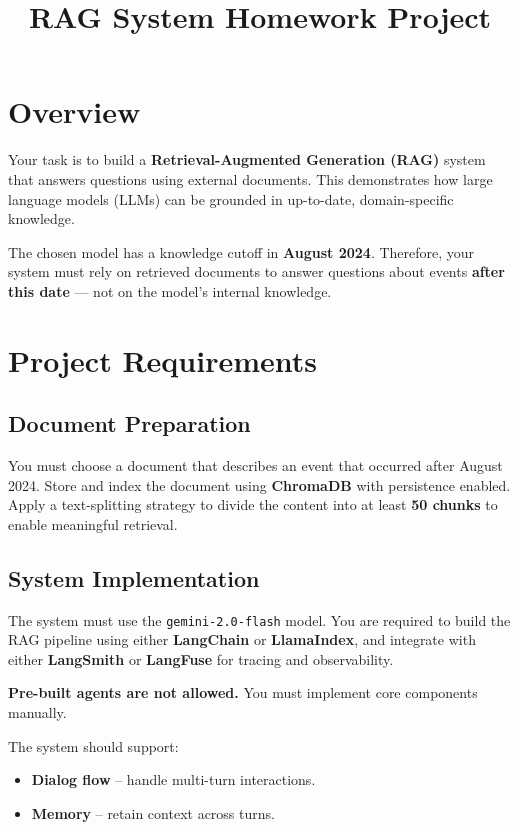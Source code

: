 \documentclass[12pt]{article}
\title{\textbf{RAG System Homework Project}}
\author{}
\date{}
\begin{document}
\maketitle

\section*{Overview}

Your task is to build a \textbf{Retrieval-Augmented Generation (RAG)} system that answers questions using external documents. This demonstrates how large language models (LLMs) can be grounded in up-to-date, domain-specific knowledge.

The chosen model has a knowledge cutoff in \textbf{August 2024}. Therefore, your system must rely on retrieved documents to answer questions about events \textbf{after this date} — not on the model’s internal knowledge.

\section*{Project Requirements}

\subsection*{Document Preparation}
You must choose a document that describes an event that occurred after August 2024. Store and index the document using \textbf{ChromaDB} with persistence enabled. Apply a text-splitting strategy to divide the content into at least \textbf{50 chunks} to enable meaningful retrieval.

\subsection*{System Implementation}
The system must use the \texttt{gemini-2.0-flash} model. You are required to build the RAG pipeline using either \textbf{LangChain} or \textbf{LlamaIndex}, and integrate with either \textbf{LangSmith} or \textbf{LangFuse} for tracing and observability.

\textbf{Pre-built agents are not allowed.} You must implement core components manually.

The system should support:
\begin{itemize}[noitemsep]
  \item \textbf{Dialog flow} – handle multi-turn interactions.
  \item \textbf{Memory} – retain context across turns.
\end{itemize}
\end{document}
